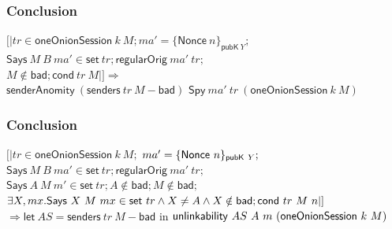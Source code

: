 \documentclass{beamer}
\begin{document}
\begin{frame}\frametitle{Conclusion}

\begin{lemma}
$[| tr\in \mathsf{oneOnionSession}\ k\ M; ma'=\{\mathsf{Nonce}\ n\}_{\mathsf{pubK}\ Y};$ \\
$\mathsf{Says}\ M\ B\ ma'\in \mathsf{set}\ tr;\mathsf{regularOrig}\ ma'\ tr; $ \\
$M\notin \mathsf{bad};\mathsf {cond}\ tr\ M|]\Longrightarrow$ \\
$\mathsf{senderAnomity}\ (\mathsf{senders}\ tr\ M-\mathsf{bad})$
$\mathsf{Spy}\ ma'\ tr\ (\mathsf{oneOnionSession }\ k\ M)$
\end{lemma}
 \end{frame}

\begin{frame}\frametitle{Conclusion}
\begin{lemma}
\label{lemma:unlinkability}
$[| tr\in \mathsf{oneOnionSession}\ k\ M;$
$ma'=\{{\sf Nonce}\ n\}_{{\sf pubK}\ Y};$
$\mathsf{Says}\ M\ B\ ma'\in \mathsf{set}\ tr;
\mathsf{regularOrig}\ ma'\ tr;$ \\
$\mathsf{Says}\ A\ M\ m'\in \mathsf{set}\ tr; A\notin \mathsf{bad};
M\notin \mathsf{bad};$\\
$\exists X,mx.\mathsf{Says}\ X\ M\ mx\in \mathsf{set}\ tr\wedge
X\neq A\wedge X\notin {\sf bad};
\mathsf{cond}\ tr\ M\ n|]$\\
$\Longrightarrow \mathsf{let}\ AS\mathsf{=senders}\ tr\ M-\mathsf{bad}$ in
${\sf unlinkability}\ AS\ A\ m\ (\mathsf{oneOnionSession}\ k\ M)$
\end{lemma}

\end{frame}
\end{document}
